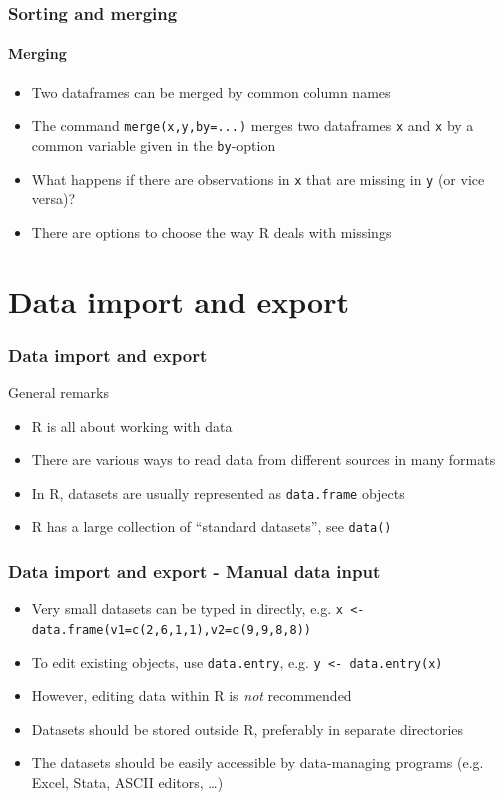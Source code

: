 \documentclass[xcolor={svgnames},10pt,
handout
]{beamer}
\begin{document}
\begin{frame}
\frametitle{Sorting and merging}
\framesubtitle{Merging}
\begin{itemize}
\item Two dataframes can be merged by common column names
\item The command \lstinline|merge(x,y,by=...)| merges two dataframes \lstinline|x|
and \lstinline|x| by a common variable given in the \lstinline|by|-option
\item What happens if there are observations in \lstinline|x| that are missing in \lstinline|y| (or vice versa)?
\item There are options to choose the way R deals with missings
\end{itemize}
\end{frame}


\section{Data import and export}
\begin{frame}
\frametitle{Data import and export}
General remarks
\begin{itemize}
\item R is all about working with data
\item There are various ways to read data from different sources in many
formats
\item In R, datasets are usually represented as \lstinline|data.frame| objects
\item R has a large collection of \textquotedblleft standard datasets\textquotedblright , see \lstinline|data()|
\end{itemize}
\end{frame}

\begin{frame}
\frametitle{Data import and export - Manual data input}
\begin{itemize}
\item Very small datasets can be typed in directly, e.g.\newline
\texttt{x <- data.frame(v1=c(2,6,1,1),v2=c(9,9,8,8))}
\item To edit existing objects, use \texttt{data.entry}, e.g.\newline
\texttt{y <- data.entry(x)}
\item However, editing data within R is \emph{not} recommended
\item Datasets should be stored outside R, preferably in separate directories
\item The datasets should be easily accessible by data-managing programs
(e.g. Excel, Stata, ASCII editors, \ldots )
\end{itemize}
\end{frame}
\end{document}
